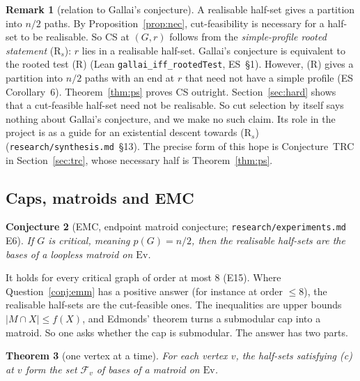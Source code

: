 \documentclass[11pt]{amsart}
\newtheorem{theorem}{Theorem}
\newtheorem{conjecture}[theorem]{Conjecture}
\theoremstyle{definition}
\newtheorem{remark}[theorem]{Remark}
\newcommand{\Ev}{\mathrm{Ev}}
\newcommand{\cF}{\mathcal F}
\begin{document}
\begin{remark}[relation to Gallai's conjecture]\label{rem:converse}
A realisable half-set gives a partition into $n/2$ paths. By Proposition~\ref{prop:nec},
cut-feasibility is necessary for a half-set to be realisable. So CS at $(G,r)$ follows from the
\emph{simple-profile rooted statement} (R$_s$): $r$ lies in a realisable half-set. Gallai's
conjecture is equivalent to the rooted test (R) (Lean \texttt{gallai\_iff\_rootedTest}, ES~\S1).
However, (R) gives a partition into $n/2$ paths with an end at $r$ that need not have a simple profile
(ES Corollary~6). Theorem~\ref{thm:ps} proves CS outright. Section~\ref{sec:hard} shows that a
cut-feasible half-set need not be realisable. So cut selection by itself says nothing about Gallai's
conjecture, and we make no such claim. Its role in the project is as a guide for an existential
descent towards (R$_s$) (\texttt{research/synthesis.md}~\S13). The precise form of this hope is
Conjecture~TRC in Section~\ref{sec:trc}, whose necessary half is Theorem~\ref{thm:ps}.
\end{remark}

\subsection{Caps, matroids and EMC}\label{sec:caps}

\begin{conjecture}[EMC, endpoint matroid conjecture; \texttt{research/experiments.md} E6]\label{conj:emc}
If $G$ is critical, meaning $p(G)=n/2$, then the realisable half-sets are the bases of a loopless
matroid on $\Ev$.
\end{conjecture}

It holds for every critical graph of order at most $8$ (E15). Where Question~\ref{conj:emm} has a
positive answer (for instance at order $\le 8$), the realisable half-sets are the cut-feasible ones. The inequalities are upper bounds
$|M\cap X|\le f(X)$, and Edmonds' theorem turns a submodular cap into a matroid. So one asks whether
the cap is submodular. The answer has two parts.

\begin{theorem}[one vertex at a time]\label{prop:pervertex}
For each vertex $v$, the half-sets satisfying (c) at $v$ form the set $\cF_v$ of bases of a matroid
on $\Ev$.
\end{theorem}
\end{document}
